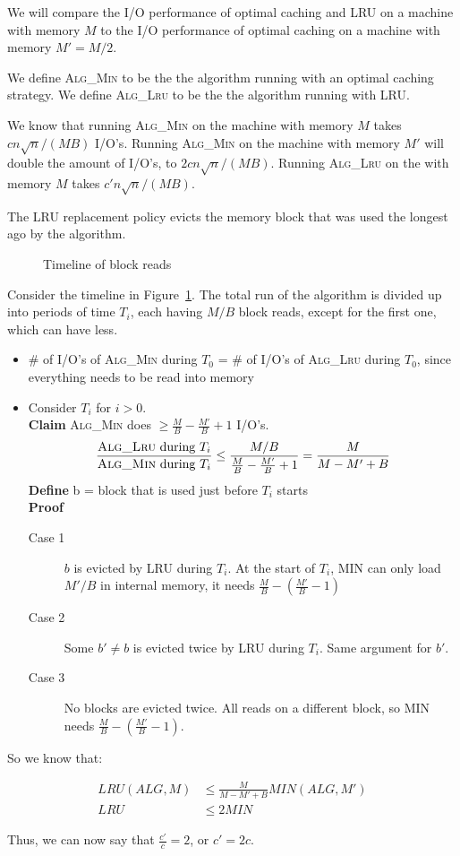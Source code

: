 We will compare the I/O performance of optimal caching and LRU on a machine with memory $M$ to the I/O performance of optimal caching on a machine with memory $M' = M/2$.

We define \textsc{Alg\_Min} to be the the algorithm running with an optimal caching strategy.
We define \textsc{Alg\_Lru} to be the the algorithm running with LRU.

We know that running \textsc{Alg\_Min} on the machine with memory $M$ takes $cn\sqrt{n}/(MB)$ I/O's.
Running \textsc{Alg\_Min} on the machine with memory $M'$ will double the amount of I/O's, to $2cn\sqrt{n}/(MB)$.
Running \textsc{Alg\_Lru} on the with memory $M$ takes $c'n\sqrt{n}/(MB)$.

The LRU replacement policy evicts the memory block that was used the longest ago by the algorithm.

\begin{figure}[H]
	\centering
	\def\svgwidth{0.8\textwidth}
	
	\caption{Timeline of block reads}
	\label{fig:ii:1:timeline}
\end{figure}

Consider the timeline in Figure~\ref{fig:ii:1:timeline}.
The total run of the algorithm is divided up into periods of time $T_i$, each having $M/B$ block reads, except for the first one, which can have less.

\begin{itemize}
	\item \# of I/O's of \textsc{Alg\_Min} during $T_0$ = \# of I/O's of \textsc{Alg\_Lru} during $T_0$, since everything needs to be read into memory
	\item Consider $T_i$ for $i > 0$.\\
		\textbf{Claim} \textsc{Alg\_Min} does $\geq \frac{M}{B} - \frac{M'}{B} + 1$ I/O's.\\
		\[
			\frac{\textsc{Alg\_Lru} \textnormal{ during } T_i}{\textsc{Alg\_Min} \textnormal{ during } T_i} \leq \frac{M/B}{\frac{M}{B} - \frac{M'}{B} + 1} = \frac{M}{M-M'+B}
		\]
		\textbf{Define} b = block that is used just before $T_i$ starts\\
		\textbf{Proof}
			\begin{description}
				\item[Case 1] $b$ is evicted by LRU during $T_i$.
					At the start of $T_i$, MIN can only load $M'/B$ in internal memory, it needs $\frac{M}{B} - (\frac{M'}{B} - 1)$
				\item[Case 2] Some $b' \not= b$ is evicted twice by LRU during $T_i$.
					Same argument for $b'$.
				\item[Case 3] No blocks are evicted twice.
					All reads on a different block, so MIN needs $\frac{M}{B} - (\frac{M'}{B} - 1)$.
			\end{description}
\end{itemize}

So we know that:

\begin{align*}
	LRU(ALG, M) &\leq \frac{M}{M-M'+B} MIN(ALG, M')\\
	LRU &\leq 2 MIN
\end{align*}

Thus, we can now say that $\frac{c'}{c} = 2$, or $c' = 2c$.
